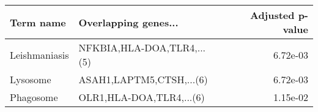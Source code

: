 \begin{tabular}{llr}
\toprule
    Term name &       Overlapping genes... &  Adjusted p-value \\
\midrule
Leishmaniasis & NFKBIA,HLA-DOA,TLR4,...(5) &          6.72e-03 \\
     Lysosome &   ASAH1,LAPTM5,CTSH,...(6) &          6.72e-03 \\
    Phagosome &   OLR1,HLA-DOA,TLR4,...(6) &          1.15e-02 \\
\bottomrule
\end{tabular}
